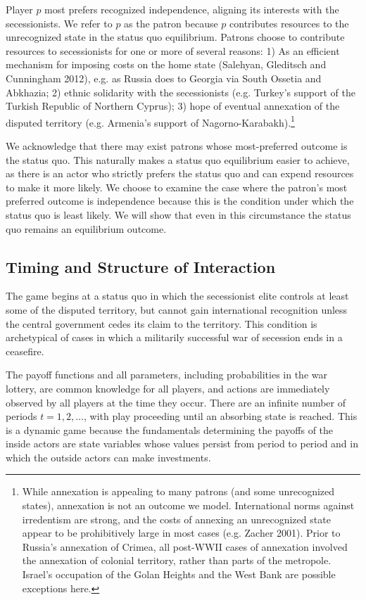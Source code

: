 \documentclass[11pt,letterpaper, notitlepage]{article}
\begin{document}
Player $p$ most prefers recognized independence, aligning its interests with the secessionists. We refer to $p$ as the patron because $p$ contributes resources to the unrecognized state in the status quo equilibrium. Patrons choose to contribute resources to secessionists for one or more of several reasons: 1) As an efficient mechanism for imposing costs on the home state (Salehyan, Gleditsch and Cunningham 2012), e.g. as Russia does to Georgia via South Ossetia and Abkhazia; 2) ethnic solidarity with the secessionists (e.g. Turkey's support of the Turkish Republic of Northern Cyprus); 3) hope of eventual annexation of the disputed territory (e.g. Armenia's support of Nagorno-Karabakh).\footnote{While annexation is appealing to many patrons (and some unrecognized states), annexation is not an outcome we model. International norms against irredentism are strong, and the costs of annexing an unrecognized state appear to be prohibitively large in most cases (e.g. Zacher 2001). Prior to Russia's annexation of Crimea, all post-WWII cases of annexation involved the annexation of colonial territory, rather than parts of the metropole. Israel's occupation of the Golan Heights and the West Bank are possible exceptions here.}

We acknowledge that there may exist patrons whose most-preferred outcome is the status quo. This naturally makes a status quo equilibrium easier to achieve, as there is an actor who strictly prefers the status quo and can expend resources to make it more likely. We choose to examine the case where the patron's most preferred outcome is independence because this is the condition under which the status quo is least likely. We will show that even in this circumstance the status quo remains an equilibrium outcome.    

\subsection{Timing and Structure of Interaction}
\label{sec:structure}

The game begins at a status quo in which the secessionist elite controls at least some of the disputed territory, but cannot gain international recognition unless the central government cedes its claim to the territory. This condition is archetypical of cases in which a militarily successful war of secession ends in a ceasefire.  

The payoff functions and all parameters, including probabilities in the war lottery, are common knowledge for all players, and actions are immediately observed by all players at the time they occur. There are an infinite number of periods $t=1,2,\ldots$, with play proceeding until an absorbing state is reached. This is a dynamic game because the fundamentals determining the payoffs of the inside actors are state variables whose values persist from period to period and in which the outside actors can make investments.
\end{document}
